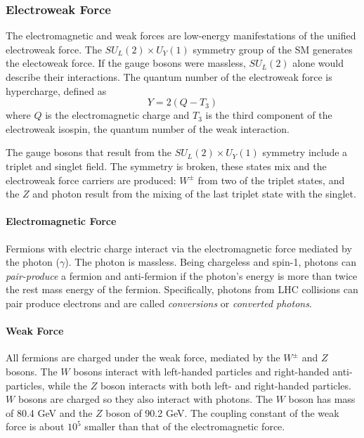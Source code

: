 \subsubsection{Electroweak Force}
The electromagnetic and weak forces are low-energy manifestations of the unified electroweak force. The $SU_{L}(2) \times U_{Y}(1)$ symmetry group of the \ac{SM} generates the electoweak force. If the gauge bosons were massless, $SU_{L}(2)$ alone would describe their interactions. The quantum number of the electroweak force is hypercharge, defined as
\begin{equation}
Y=2(Q-T_{3})
\end{equation}
where $Q$ is the electromagnetic charge and $T_3$ is the third component of the electroweak isospin, the quantum number of the weak interaction.

The gauge bosons that result from the $SU_{L}(2) \times U_{Y}(1)$ symmetry include a triplet and singlet field. The symmetry is broken, these states mix and the electroweak force carriers are produced: $W^{\pm}$ from two of the triplet states, and the $Z$ and photon result from the mixing of the last triplet state with the singlet.

\paragraph{Electromagnetic Force}

Fermions with electric charge interact via the electromagnetic force mediated by the photon ($\gamma$). The photon is massless. Being chargeless and spin-1, photons can \emph{pair-produce} a fermion and anti-fermion if the photon's energy is more than twice the rest mass energy of the fermion. Specifically, photons from \ac{LHC} collisions can pair produce electrons and are called \emph{conversions} or \emph{converted photons}.

\paragraph{Weak Force}
All fermions are charged under the weak force, mediated by the $W^{\pm}$ and $Z$ bosons. The $W$ bosons interact with left-handed particles and right-handed anti-particles, while the $Z$ boson interacts with both left- and right-handed particles. $W$ bosons are charged so they also interact with photons. The $W$ boson has mass of 80.4 GeV and the $Z$ boson of 90.2 GeV. The coupling constant of the weak force is about $10^{5}$ smaller than that of the electromagnetic force.

